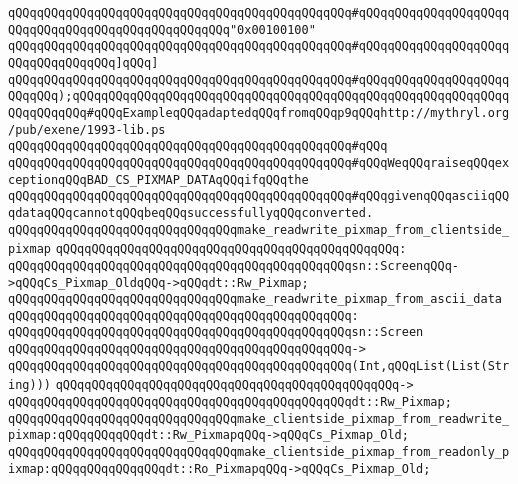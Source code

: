 \verb|qQQqqQQqqQQqqQQqqQQqqQQqqQQqqQQqqQQqqQQqqQQqqQQq#qQQqqQQqqQQqqQQqqQQqqQQqqQQqqQQqqQQqqQQqqQQqqQQqqQQq"0x00100100"|\newline
\verb|qQQqqQQqqQQqqQQqqQQqqQQqqQQqqQQqqQQqqQQqqQQqqQQq#qQQqqQQqqQQqqQQqqQQqqQQqqQQqqQQqqQQq]qQQq]|\newline
\verb|qQQqqQQqqQQqqQQqqQQqqQQqqQQqqQQqqQQqqQQqqQQqqQQq#qQQqqQQqqQQqqQQqqQQqqQQqqQQq);qQQqqQQqqQQqqQQqqQQqqQQqqQQqqQQqqQQqqQQqqQQqqQQqqQQqqQQqqQQqqQQqqQQqqQQq#qQQqExampleqQQqadaptedqQQqfromqQQqp9qQQqhttp://mythryl.org/pub/exene/1993-lib.ps|\newline
\verb|qQQqqQQqqQQqqQQqqQQqqQQqqQQqqQQqqQQqqQQqqQQqqQQq#qQQq|\newline
\verb|qQQqqQQqqQQqqQQqqQQqqQQqqQQqqQQqqQQqqQQqqQQqqQQq#qQQqWeqQQqraiseqQQqexceptionqQQqBAD_CS_PIXMAP_DATAqQQqifqQQqthe|\newline
\verb|qQQqqQQqqQQqqQQqqQQqqQQqqQQqqQQqqQQqqQQqqQQqqQQq#qQQqgivenqQQqasciiqQQqdataqQQqcannotqQQqbeqQQqsuccessfullyqQQqconverted.|\newline
\newline
\verb|qQQqqQQqqQQqqQQqqQQqqQQqqQQqqQQqmake_readwrite_pixmap_from_clientside_pixmap|\newline
\verb|qQQqqQQqqQQqqQQqqQQqqQQqqQQqqQQqqQQqqQQqqQQqqQQq:|\newline
\verb|qQQqqQQqqQQqqQQqqQQqqQQqqQQqqQQqqQQqqQQqqQQqqQQqsn::ScreenqQQq->qQQqCs_Pixmap_OldqQQq->qQQqdt::Rw_Pixmap;|\newline
\newline
\verb|qQQqqQQqqQQqqQQqqQQqqQQqqQQqqQQqmake_readwrite_pixmap_from_ascii_data|\newline
\verb|qQQqqQQqqQQqqQQqqQQqqQQqqQQqqQQqqQQqqQQqqQQqqQQq:|\newline
\verb|qQQqqQQqqQQqqQQqqQQqqQQqqQQqqQQqqQQqqQQqqQQqqQQqsn::Screen|\newline
\verb|qQQqqQQqqQQqqQQqqQQqqQQqqQQqqQQqqQQqqQQqqQQqqQQq->|\newline
\verb|qQQqqQQqqQQqqQQqqQQqqQQqqQQqqQQqqQQqqQQqqQQqqQQq(Int,qQQqList(List(String)))|\newline
\verb|qQQqqQQqqQQqqQQqqQQqqQQqqQQqqQQqqQQqqQQqqQQqqQQq->|\newline
\verb|qQQqqQQqqQQqqQQqqQQqqQQqqQQqqQQqqQQqqQQqqQQqqQQqdt::Rw_Pixmap;|\newline
\newline
\verb|qQQqqQQqqQQqqQQqqQQqqQQqqQQqqQQqmake_clientside_pixmap_from_readwrite_pixmap:qQQqqQQqqQQqdt::Rw_PixmapqQQq->qQQqCs_Pixmap_Old;|\newline
\verb|qQQqqQQqqQQqqQQqqQQqqQQqqQQqqQQqmake_clientside_pixmap_from_readonly_pixmap:qQQqqQQqqQQqqQQqdt::Ro_PixmapqQQq->qQQqCs_Pixmap_Old;|\newline
